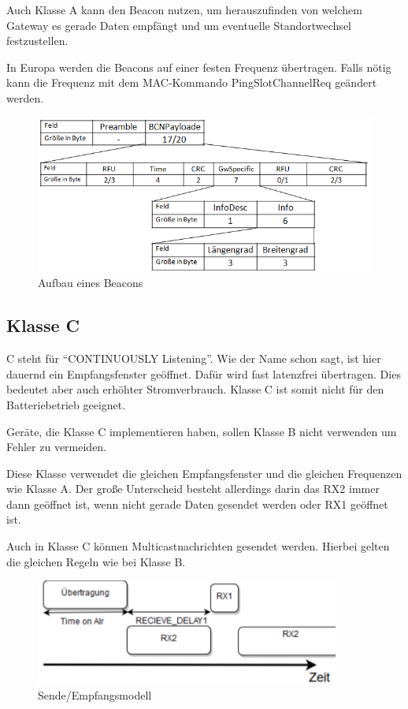 \documentclass[a4paper, 12pt]{article}
\begin{document}
                Auch Klasse A kann den Beacon nutzen, um herauszufinden von welchem Gateway es gerade Daten empfängt 
                und um eventuelle Standortwechsel festzustellen.
                
                In Europa werden die Beacons auf einer festen Frequenz übertragen. Falls nötig kann die Frequenz mit dem  
                MAC-Kommando PingSlotChannelReq geändert werden.
                \newpage
                \begin{figure}[ht]
                    \centering
                    \includegraphics[width=\textwidth]{Beacon}
                    \caption{Aufbau eines Beacons}
                \end{figure}
        \subsection{Klasse C}
            C steht für ``CONTINUOUSLY Listening''. Wie der Name schon sagt, ist hier dauernd ein Empfangsfenster geöffnet.
            Dafür wird fast latenzfrei übertragen. Dies bedeutet aber auch erhöhter Stromverbrauch. Klasse C ist somit 
            nicht für den Batteriebetrieb geeignet. 

            Geräte, die Klasse C implementieren haben, sollen Klasse B nicht verwenden um Fehler zu vermeiden.

            Diese Klasse verwendet die gleichen Empfangsfenster und die gleichen Frequenzen wie Klasse A. Der große 
            Unterscheid besteht allerdings darin das RX2 immer dann geöffnet ist, wenn nicht gerade Daten gesendet 
            werden oder RX1 geöffnet ist. 

            Auch in Klasse C können Multicastnachrichten gesendet werden. Hierbei gelten die gleichen 
            Regeln wie bei Klasse B.


            \begin{figure}[ht]
                \centering
                \includegraphics[width=10cm]{KlasseC}
                \caption{Sende/Empfangsmodell}
            \end{figure}
\end{document}
